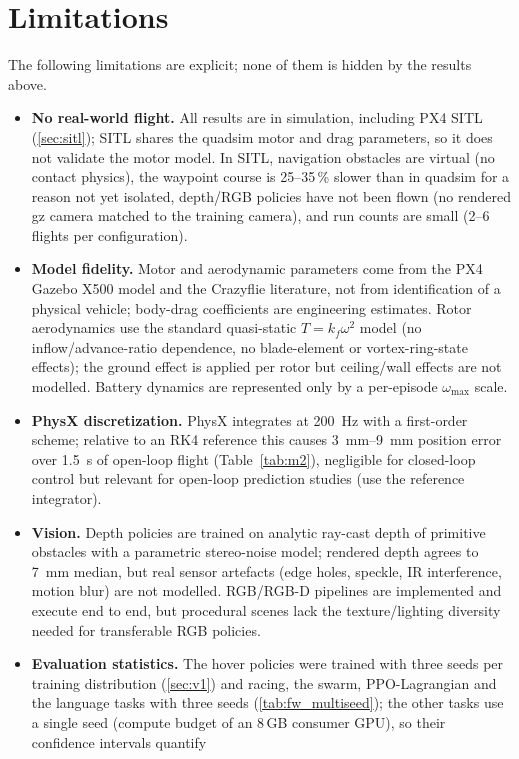 \documentclass[11pt,a4paper]{article}
\begin{document}
\section{Limitations}
The following limitations are explicit; none of them is hidden by the results above.
\begin{itemize}
\item \textbf{No real-world flight.} All results are in simulation, including PX4 SITL (\cref{sec:sitl}); SITL shares the
quadsim motor and drag parameters, so it does not validate the motor model. In SITL, navigation obstacles are virtual
(no contact physics), the waypoint course is 25--35\,\% slower than in quadsim for a reason not yet isolated, depth/RGB
policies have not been flown (no rendered gz camera matched to the training camera), and run counts are small
(2--6 flights per configuration).
\item \textbf{Model fidelity.} Motor and aerodynamic parameters come from the PX4 Gazebo X500 model and the Crazyflie
literature, not from identification of a physical vehicle; body-drag coefficients are engineering estimates. Rotor
aerodynamics use the standard quasi-static $T=k_f\omega^2$ model (no inflow/advance-ratio dependence, no blade-element
or vortex-ring-state effects); the ground effect is applied per rotor but ceiling/wall effects are not modelled.
Battery dynamics are represented only by a per-episode $\omega_{\max}$ scale.
\item \textbf{PhysX discretization.} PhysX integrates at \SI{200}{Hz} with a first-order scheme; relative to an RK4
reference this causes \SIrange{3}{9}{mm} position error over \SI{1.5}{s} of open-loop flight (Table~\ref{tab:m2}),
negligible for closed-loop control but relevant for open-loop prediction studies (use the reference integrator).
\item \textbf{Vision.} Depth policies are trained on analytic ray-cast depth of primitive obstacles with a parametric
stereo-noise model; rendered depth agrees to \SI{7}{mm} median, but real sensor artefacts (edge holes, speckle,
IR interference, motion blur) are not modelled. RGB/RGB-D pipelines are implemented and execute end to end, but
procedural scenes lack the texture/lighting diversity needed for transferable RGB policies.
\item \textbf{Evaluation statistics.} The hover policies were trained with three seeds per training distribution
(\cref{sec:v1}) and racing, the swarm, PPO-Lagrangian and the language tasks with three seeds (\cref{tab:fw_multiseed});
the other tasks use a single seed (compute budget of an 8\,GB consumer GPU), so their confidence intervals quantify

\end{itemize}
\end{document}
